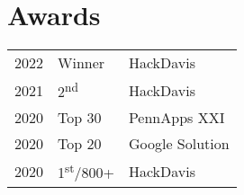 \documentclass[]{deedy-resume-openfont}
\begin{document}
\begin{minipage}[t]{0.33\textwidth}

\section{Awards} 
\begin{tabular}{rll}
2022 & Winner & HackDavis\\
2021 & 2\textsuperscript{nd} & HackDavis\\
2020 & Top 30 & PennApps XXI\\
2020 & Top 20  & Google Solution\\
2020 & 1\textsuperscript{st}/800+  & HackDavis\\
\end{tabular}
\sectionsep

%
%

\end{minipage} 
\hfill
\end{document}
